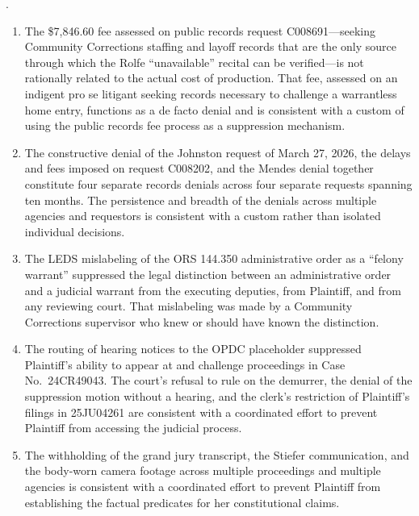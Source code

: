 \documentclass[12pt,letterpaper]{article}
\newcounter{complaintpara}
\newenvironment{paras}{%
	\begin{list}{\arabic{complaintpara}.}{%
			\setlength{\leftmargin}{0.5in}%
			\setlength{\labelwidth}{0.4in}%
			\setlength{\labelsep}{0.1in}%
			\setlength{\itemsep}{0pt}%
			\setlength{\parsep}{0pt}%
			\setlength{\topsep}{6pt}%
		}%
	}{%
	\end{list}%
}
\newenvironment{subparas}{%
	\begin{enumerate}[label=\alph*.,leftmargin=0.75in,itemsep=0pt,%
		parsep=0pt,topsep=4pt]%
	}{%
	\end{enumerate}%
}
\begin{document}
\begin{paras}
\begin{subparas}
			\item The \$7,846.60 fee assessed on public records
			request C008691---seeking Community Corrections staffing and
			layoff records that are the only source through which the
			Rolfe ``unavailable'' recital can be verified---is not
			rationally related to the actual cost of production. That
			fee, assessed on an indigent pro se litigant seeking records
			necessary to challenge a warrantless home entry, functions
			as a de facto denial and is consistent with a custom of
			using the public records fee process as a suppression
			mechanism.
			
			\item The constructive denial of the Johnston request of
			March 27, 2026, the delays and fees imposed on request
			C008202, and the Mendes denial together constitute four
			separate records denials across four separate requests
			spanning ten months. The persistence and breadth of the
			denials across multiple agencies and requestors is
			consistent with a custom rather than isolated individual
			decisions.
			
			\item The LEDS mislabeling of the ORS 144.350 administrative
			order as a ``felony warrant'' suppressed the legal
			distinction between an administrative order and a judicial
			warrant from the executing deputies, from Plaintiff, and
			from any reviewing court. That mislabeling was made by a
			Community Corrections supervisor who knew or should have
			known the distinction.
			
			\item The routing of hearing notices to the OPDC placeholder
			suppressed Plaintiff's ability to appear at and challenge
			proceedings in Case No.\ 24CR49043. The court's refusal to
			rule on the demurrer, the denial of the suppression motion
			without a hearing, and the clerk's restriction of
			Plaintiff's filings in 25JU04261 are consistent with a
			coordinated effort to prevent Plaintiff from accessing the
			judicial process.
			
			\item The withholding of the grand jury transcript, the
			Stiefer communication, and the body-worn camera footage
			across multiple proceedings and multiple agencies is
			consistent with a coordinated effort to prevent Plaintiff
			from establishing the factual predicates for her
			constitutional claims.
			
		\end{subparas}
		

\end{paras}
\end{document}
